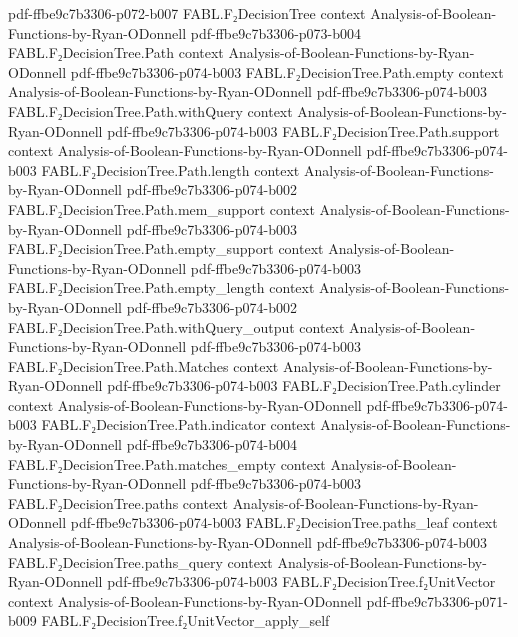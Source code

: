\begin{theorem}
  {pdf-ffbe9c7b3306-p072-b007}
\proofstep
  {FABL.F₂DecisionTree}
  {context}
  {Analysis-of-Boolean-Functions-by-Ryan-ODonnell}
  {pdf-ffbe9c7b3306-p073-b004}
\proofstep
  {FABL.F₂DecisionTree.Path}
  {context}
  {Analysis-of-Boolean-Functions-by-Ryan-ODonnell}
  {pdf-ffbe9c7b3306-p074-b003}
\proofstep
  {FABL.F₂DecisionTree.Path.empty}
  {context}
  {Analysis-of-Boolean-Functions-by-Ryan-ODonnell}
  {pdf-ffbe9c7b3306-p074-b003}
\proofstep
  {FABL.F₂DecisionTree.Path.withQuery}
  {context}
  {Analysis-of-Boolean-Functions-by-Ryan-ODonnell}
  {pdf-ffbe9c7b3306-p074-b003}
\proofstep
  {FABL.F₂DecisionTree.Path.support}
  {context}
  {Analysis-of-Boolean-Functions-by-Ryan-ODonnell}
  {pdf-ffbe9c7b3306-p074-b003}
\proofstep
  {FABL.F₂DecisionTree.Path.length}
  {context}
  {Analysis-of-Boolean-Functions-by-Ryan-ODonnell}
  {pdf-ffbe9c7b3306-p074-b002}
\proofstep
  {FABL.F₂DecisionTree.Path.mem_support}
  {context}
  {Analysis-of-Boolean-Functions-by-Ryan-ODonnell}
  {pdf-ffbe9c7b3306-p074-b003}
\proofstep
  {FABL.F₂DecisionTree.Path.empty_support}
  {context}
  {Analysis-of-Boolean-Functions-by-Ryan-ODonnell}
  {pdf-ffbe9c7b3306-p074-b003}
\proofstep
  {FABL.F₂DecisionTree.Path.empty_length}
  {context}
  {Analysis-of-Boolean-Functions-by-Ryan-ODonnell}
  {pdf-ffbe9c7b3306-p074-b002}
\proofstep
  {FABL.F₂DecisionTree.Path.withQuery_output}
  {context}
  {Analysis-of-Boolean-Functions-by-Ryan-ODonnell}
  {pdf-ffbe9c7b3306-p074-b003}
\proofstep
  {FABL.F₂DecisionTree.Path.Matches}
  {context}
  {Analysis-of-Boolean-Functions-by-Ryan-ODonnell}
  {pdf-ffbe9c7b3306-p074-b003}
\proofstep
  {FABL.F₂DecisionTree.Path.cylinder}
  {context}
  {Analysis-of-Boolean-Functions-by-Ryan-ODonnell}
  {pdf-ffbe9c7b3306-p074-b003}
\proofstep
  {FABL.F₂DecisionTree.Path.indicator}
  {context}
  {Analysis-of-Boolean-Functions-by-Ryan-ODonnell}
  {pdf-ffbe9c7b3306-p074-b004}
\proofstep
  {FABL.F₂DecisionTree.Path.matches_empty}
  {context}
  {Analysis-of-Boolean-Functions-by-Ryan-ODonnell}
  {pdf-ffbe9c7b3306-p074-b003}
\proofstep
  {FABL.F₂DecisionTree.paths}
  {context}
  {Analysis-of-Boolean-Functions-by-Ryan-ODonnell}
  {pdf-ffbe9c7b3306-p074-b003}
\proofstep
  {FABL.F₂DecisionTree.paths_leaf}
  {context}
  {Analysis-of-Boolean-Functions-by-Ryan-ODonnell}
  {pdf-ffbe9c7b3306-p074-b003}
\proofstep
  {FABL.F₂DecisionTree.paths_query}
  {context}
  {Analysis-of-Boolean-Functions-by-Ryan-ODonnell}
  {pdf-ffbe9c7b3306-p074-b003}
\proofstep
  {FABL.F₂DecisionTree.f₂UnitVector}
  {context}
  {Analysis-of-Boolean-Functions-by-Ryan-ODonnell}
  {pdf-ffbe9c7b3306-p071-b009}
\proofstep
  {FABL.F₂DecisionTree.f₂UnitVector_apply_self}

\end{theorem}
